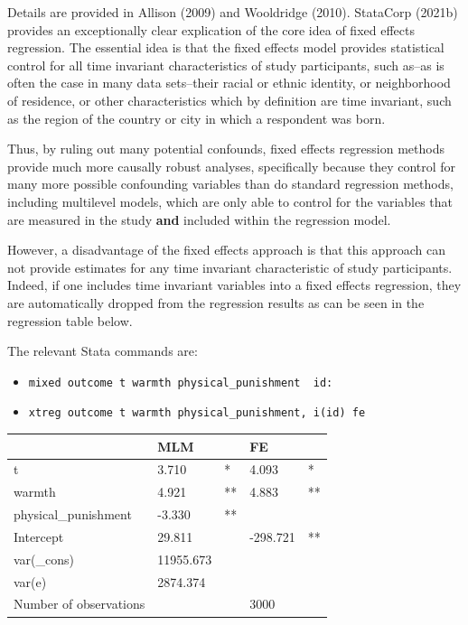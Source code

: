 \documentclass[
  letterpaper,
  DIV=11,
  numbers=noendperiod]{scrreprt}
\providecommand{\tightlist}{%
  \setlength{\itemsep}{0pt}\setlength{\parskip}{0pt}}\usepackage{longtable,booktabs,array}
\begin{document}
Details are provided in Allison (2009) and Wooldridge (2010). StataCorp
(2021b) provides an exceptionally clear explication of the core idea of
fixed effects regression. The essential idea is that the fixed effects
model provides statistical control for all time invariant
characteristics of study participants, such as--as is often the case in
many data sets--their racial or ethnic identity, or neighborhood of
residence, or other characteristics which by definition are time
invariant, such as the region of the country or city in which a
respondent was born.

Thus, by ruling out many potential confounds, fixed effects regression
methods provide much more causally robust analyses, specifically because
they control for many more possible confounding variables than do
standard regression methods, including multilevel models, which are only
able to control for the variables that are measured in the study
\textbf{and} included within the regression model.

However, a disadvantage of the fixed effects approach is that this
approach can not provide estimates for any time invariant characteristic
of study participants. Indeed, if one includes time invariant variables
into a fixed effects regression, they are automatically dropped from the
regression results as can be seen in the regression table below.

The relevant Stata commands are:

\begin{itemize}
\tightlist
\item
  \texttt{mixed\ outcome\ t\ warmth\ physical\_punishment\ \textbar{}\textbar{}\ id:}
\item
  \texttt{xtreg\ outcome\ t\ warmth\ physical\_punishment,\ i(id)\ fe}
\end{itemize}

\begin{longtable}[]{@{}lllll@{}}
\toprule()
& MLM & & FE & \\
\midrule()
\endhead
t & 3.710 & * & 4.093 & * \\
warmth & 4.921 & ** & 4.883 & ** \\
physical\_punishment & -3.330 & ** & & \\
Intercept & 29.811 & & -298.721 & ** \\
var(\_cons) & 11955.673 & & & \\
var(e) & 2874.374 & & & \\
Number of observations & & & 3000 & \\
\bottomrule()
\end{longtable}
\end{document}
